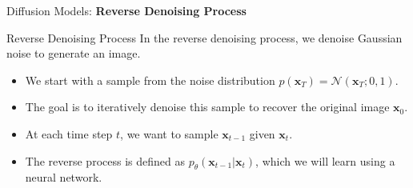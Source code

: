 \begin{frame}{}
    \LARGE Diffusion Models: \textbf{Reverse Denoising Process}
\end{frame}

\begin{frame}{Reverse Denoising Process}
    In the reverse denoising process, we denoise Gaussian noise to generate an image.
    \begin{itemize}
        \item<2-> We start with a sample from the noise distribution $p(\mathbf{x}_T) = \mathcal{N}(\mathbf{x}_T; 0, 1)$.
        \item<3-> The goal is to iteratively denoise this sample to recover the original image $\mathbf{x}_0$.
        \item<4-> At each time step $t$, we want to sample $\mathbf{x}_{t-1}$ given $\mathbf{x}_t$.
        \item<5-> The reverse process is defined as $p_\theta(\mathbf{x}_{t-1}|\mathbf{x}_t)$, which we will learn using a neural network.
    \end{itemize}
\end{frame}


